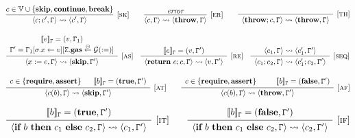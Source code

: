 \begin{figure}[t]
\centering
$$
\infer[{[\rname{sk}]}]{\conf{c;c',\cstate} \leadsto \conf{c',\cstate}}{c \in \mathbb{V} \cup \{\textbf{skip},\textbf{continue},\textbf{break}\}}
~~~~~~
\infer[{[\rname{er}]}]{\conf{c,\cstate} \leadsto \conf{\textbf{throw},\cstate}}{\textit{error}}
~~~~~~
\infer[{[\rname{th}]}]{
	\begin{array}{c}
	\conf{\textbf{throw};c,\cstate}
	\leadsto \conf{\textbf{throw},\cstate}
	\end{array}
	}{}
$$

$$
\infer[{[\rname{as}]}]
{
	\begin{array}{l}
	\conf{x:=e,\cstate} 
	\leadsto \conf{\textbf{skip},\cstate'}
	\end{array}
}{
	\begin{array}{c}
	\eval{e}_{\cstate} = (v,\cstate_1)
	\\
	\cstate' = \cstate_1[\lstate.x \leftarrow v][\gstate.\textbf{gas} \subg \gas(:=)]
	\end{array}}
~~~
\infer[{[\rname{re}]}]{
	\begin{array}{c}
		\conf{\textbf{return}~e;c, \cstate}
		\leadsto \conf{v,\cstate'}
	\end{array}
}{\eval{e}_\cstate  = (v,\cstate')}
~~~
\infer[{[\rname{seq}]}]{
	\begin{array}{c}
		\conf{c_1;c_2,\cstate}
		\leadsto \conf{c'_1;c_2,\cstate'}
	\end{array}
}{\conf{c_1,\cstate} \leadsto \conf{c'_1,\cstate'}}	
$$

$$
\infer[{[\rname{at}]}]{\conf{c(b),\cstate} \leadsto \conf{\textbf{skip},\cstate'}}{
	\begin{array}{c}
	c \in \{\textbf{require},\textbf{assert}\}
	~~~~~
	\eval{b}_{\cstate} = (\textbf{true},\cstate')
	\end{array}
}
~~~~~~
\infer[{[\rname{af}]}]{\conf{c(b),\cstate} \leadsto \conf{\textbf{throw},\cstate'}}{
	\begin{array}{c}
	c \in \{\textbf{require},\textbf{assert}\}~~~
	~~~~~
	\eval{b}_{\cstate} = (\textbf{false},\cstate')
	\end{array}}
$$

$$
\infer[{[\rname{it}]}]{
	\begin{array}{c}
	\conf{\ifs{b}{c_1}{c_2},\cstate}
	\leadsto \conf{c_1,\cstate'}
	\end{array}
}
{
	\begin{array}{c}
	\eval{b}_{\cstate} = (\textbf{true},\cstate')
	\end{array}
}	
~~~~~~
\infer[{[\rname{if}]}]{
	\begin{array}{c}
	\conf{\ifs{b}{c_1}{c_2},\cstate}
	\leadsto \conf{c_2,\cstate'}
	\end{array}
}
{
	\begin{array}{c}
	\eval{b}_{\cstate} = (\textbf{false},\cstate')\\
	\end{array}
}	
$$


\end{figure}
